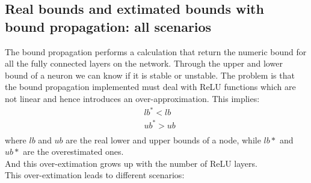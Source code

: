 \subsection{Real bounds and extimated bounds with bound propagation: all scenarios}
\label{subsec:all_bounds_scenarios}
 The bound propagation performs a calculation that return the numeric bound for all the fully connected layers on the network. Through the upper and lower bound of a neuron we can know if it is stable or unstable. The problem is that the bound propagation implemented must deal with ReLU functions which are not linear and hence introduces an over-approximation.
This implies:
\begin{equation}
	\begin{aligned}
		&lb^* < lb \\
		&ub^* > ub \\
	\end{aligned}
\end{equation}
where $lb$ and $ub$ are the real lower and upper bounds of a node, while $lb*$ and $ub*$ are the overestimated ones.\\
And this over-extimation grows up with the number of ReLU layers.\\
This over-extimation leads to different scenarios:

